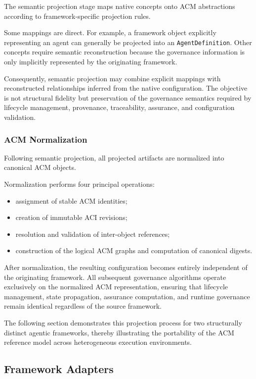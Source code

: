 \documentclass[10pt]{article}
\begin{document}
The semantic projection stage maps native concepts onto ACM abstractions according to framework-specific projection rules.

Some mappings are direct. For example, a framework object explicitly representing an agent can generally be projected into an \texttt{AgentDefinition}. Other concepts require semantic reconstruction because the governance information is only implicitly represented by the originating framework.

Consequently, semantic projection may combine explicit mappings with reconstructed relationships inferred from the native configuration. The objective is not structural fidelity but preservation of the governance semantics required by lifecycle management, provenance, traceability, assurance, and configuration validation.

\subsubsection{ACM Normalization}

Following semantic projection, all projected artifacts are normalized into canonical ACM objects.

Normalization performs four principal operations:

\begin{itemize}
    \item assignment of stable ACM identities;
    \item creation of immutable ACI revisions;
    \item resolution and validation of inter-object references;
    \item construction of the logical ACM graphs and computation of canonical digests.
\end{itemize}

After normalization, the resulting configuration becomes entirely independent of the originating framework. All subsequent governance algorithms operate exclusively on the normalized ACM representation, ensuring that lifecycle management, state propagation, assurance computation, and runtime governance remain identical regardless of the source framework.

The following section demonstrates this projection process for two structurally distinct agentic frameworks, thereby illustrating the portability of the ACM reference model across heterogeneous execution environments.

\subsection{Framework Adapters}
\label{sec:framework_adapters}
\end{document}
